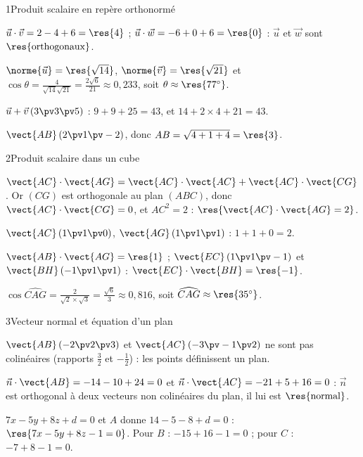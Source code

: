 

\begin{deuxcolonnes}

\begin{corrige}{1}{Produit scalaire en repère orthonormé}
\begin{questions}
  \item $\vec u\cdot\vec v=2-4+6=\res{4}$ ; $\vec u\cdot\vec w=-6+0+6=\res{0}$ : $\vec u$ et $\vec w$ sont
    $\res{\text{orthogonaux}}$.
  \item $\norme{\vec u}=\res{\sqrt{14}}$, $\norme{\vec v}=\res{\sqrt{21}}$ et\\
    $\cos\theta=\frac{4}{\sqrt{14}\sqrt{21}}=\frac{2\sqrt6}{21}\approx0{,}233$, soit $\theta\approx\res{77^\circ}$.
  \item $\vec u+\vec v\,(3\pv3\pv5)$ : $9+9+25=43$, et $14+2\times4+21=43$.
  \item $\vect{AB}\,(2\pv1\pv-2)$, donc $AB=\sqrt{4+1+4}=\res{3}$.
\end{questions}
\end{corrige}

\begin{corrige}{2}{Produit scalaire dans un cube}
\begin{questions}
  \item $\vect{AC}\cdot\vect{AG}=\vect{AC}\cdot\vect{AC}+\vect{AC}\cdot\vect{CG}$. Or $(CG)$ est orthogonale au plan $(ABC)$,
    donc $\vect{AC}\cdot\vect{CG}=0$, et $AC^2=2$ : $\res{\vect{AC}\cdot\vect{AG}=2}$.
  \item $\vect{AC}\,(1\pv1\pv0)$, $\vect{AG}\,(1\pv1\pv1)$ : $1+1+0=2$.
  \item $\vect{AB}\cdot\vect{AG}=\res{1}$ ; $\vect{EC}\,(1\pv1\pv-1)$ et $\vect{BH}\,(-1\pv1\pv1)$ : $\vect{EC}\cdot\vect{BH}=\res{-1}$.
  \item $\cos\widehat{CAG}=\frac{2}{\sqrt2\times\sqrt3}=\frac{\sqrt6}{3}\approx0{,}816$, soit $\widehat{CAG}\approx\res{35^\circ}$.
\end{questions}
\end{corrige}

\begin{corrige}{3}{Vecteur normal et équation d'un plan}
\begin{questions}
  \item $\vect{AB}\,(-2\pv2\pv3)$ et $\vect{AC}\,(-3\pv-1\pv2)$ ne sont pas colinéaires (rapports $\frac32$ et $-\frac12$) : les points
    définissent un plan.
  \item $\vec n\cdot\vect{AB}=-14-10+24=0$ et $\vec n\cdot\vect{AC}=-21+5+16=0$ : $\vec n$ est orthogonal à deux vecteurs non colinéaires
    du plan, il lui est $\res{\text{normal}}$.
  \item $7x-5y+8z+d=0$ et $A$ donne $14-5-8+d=0$ :\\ $\res{7x-5y+8z-1=0}$. Pour $B$ : $-15+16-1=0$ ; pour $C$ : $-7+8-1=0$.
\end{questions}
\end{corrige}


\end{deuxcolonnes}
